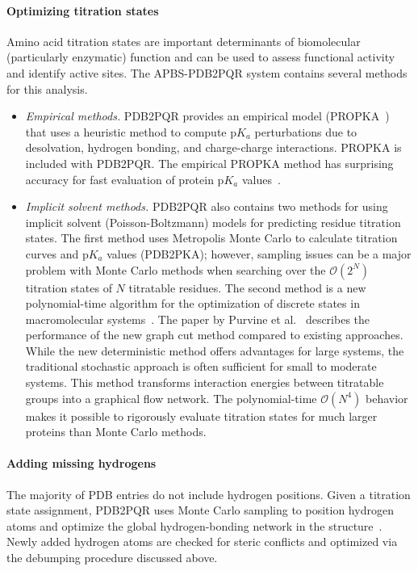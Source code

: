 \documentclass[12pt,titlepage]{article}
\newcommand{\revision}[1]{#1}
\begin{document}
\paragraph{Optimizing titration states}
Amino acid tit\-rat\-ion states are important determinants of bio\-molecular (particularly enzymatic) function and can be used to assess functional activity and identify active sites.
The APBS-PDB2PQR system contains several methods for this analysis.
\begin{itemize}
	\item \textit{Empirical methods.}
	PDB2PQR provides an empirical model (PROPKA~\cite{Sondergaard2011}) that uses a heuristic method to compute p$K_a$ perturbations due to desolvation, hydrogen bonding, and charge-charge interactions.
	PROPKA is included with PDB2PQR.
	The empirical PROPKA method has surprising accuracy for fast evaluation of protein p$K_a$ values~\cite{Li2005}.
	\item \textit{Implicit solvent methods.}
	PDB2PQR also contains two methods for using implicit solvent (Poisson-Boltzmann) models for predicting residue titration states.
	The first method uses Metropolis Monte Carlo to \revision{calculate} titration curves and p$K_a$ values (PDB2PKA); however, sampling issues can be a major problem with Monte Carlo methods when searching over the $\mathcal{O}\left(2^N\right)$ titration states of $N$ titratable residues.
	The second method is a new polynomial-time algorithm for the optimization of discrete states in macromolecular systems~\cite{Purvine2016}.
	\revision{The paper by Purvine et al.~\cite{Purvine2016} describes the performance of the new graph cut method compared to existing approaches.
	While the new deterministic method offers advantages for large systems, the traditional stochastic approach is often sufficient for small to moderate systems.}
	This method transforms interaction energies between titratable groups into a graphical flow network.
	The polynomial-time $\mathcal{O}\left(N^4\right)$ behavior makes it possible to rigorously evaluate titration states for much larger proteins than Monte Carlo methods.
\end{itemize}

\paragraph{Adding missing hydrogens}
The majority of PDB entries do not include hydrogen positions.
Given a titration state assignment, PDB2PQR uses Monte Carlo sampling to position hydrogen atoms and optimize the global hydrogen-bonding network in the structure~\cite{Nielsen2001}.
Newly added hydrogen atoms are checked for steric conflicts and optimized via the debumping procedure discussed above.
\end{document}
